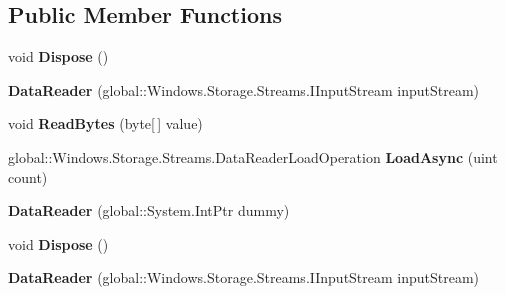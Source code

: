 \subsection*{Public Member Functions}
\begin{DoxyCompactItemize}
\item 
\mbox{\label{class_windows_1_1_storage_1_1_streams_1_1_data_reader_a6010f889660514f452ca98b0453d9573}} 
void {\bfseries Dispose} ()
\item 
\mbox{\label{class_windows_1_1_storage_1_1_streams_1_1_data_reader_a5898ae07f0205f604d43e9c687b92944}} 
{\bfseries Data\+Reader} (global\+::\+Windows.\+Storage.\+Streams.\+I\+Input\+Stream input\+Stream)
\item 
\mbox{\label{class_windows_1_1_storage_1_1_streams_1_1_data_reader_a3ef0353a0e8404fcce465021822f372f}} 
void {\bfseries Read\+Bytes} (byte\mbox{[}$\,$\mbox{]} value)
\item 
\mbox{\label{class_windows_1_1_storage_1_1_streams_1_1_data_reader_a8851a4d0dcb16463f109906d39321a9d}} 
global\+::\+Windows.\+Storage.\+Streams.\+Data\+Reader\+Load\+Operation {\bfseries Load\+Async} (uint count)
\item 
\mbox{\label{class_windows_1_1_storage_1_1_streams_1_1_data_reader_a7190172f276be7251509999eeed10931}} 
{\bfseries Data\+Reader} (global\+::\+System.\+Int\+Ptr dummy)
\item 
\mbox{\label{class_windows_1_1_storage_1_1_streams_1_1_data_reader_a6010f889660514f452ca98b0453d9573}} 
void {\bfseries Dispose} ()
\item 
\mbox{\label{class_windows_1_1_storage_1_1_streams_1_1_data_reader_a5898ae07f0205f604d43e9c687b92944}} 
{\bfseries Data\+Reader} (global\+::\+Windows.\+Storage.\+Streams.\+I\+Input\+Stream input\+Stream)
\item 
\mbox{\label{class_windows_1_1_storage_1_1_streams_1_1_data_reader_a3ef0353a0e8404fcce465021822f372f}} 

\end{DoxyCompactItemize}
